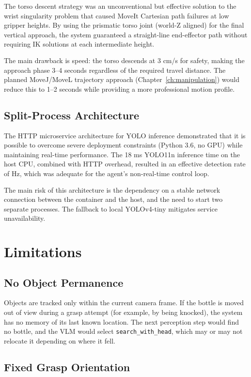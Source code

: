 The torso descent strategy was an unconventional but effective solution to the wrist
singularity problem that caused MoveIt Cartesian path failures at low gripper heights.
By using the prismatic torso joint (world-Z aligned) for the final vertical approach,
the system guaranteed a straight-line end-effector path without requiring IK solutions
at each intermediate height.

The main drawback is speed: the torso descends at 3 cm/s for safety, making the
approach phase 3--4 seconds regardless of the required travel distance.
The planned MoveJ/MoveL trajectory approach (Chapter~\ref{ch:manipulation}) would
reduce this to 1--2 seconds while providing a more professional motion profile.

\subsection{Split-Process Architecture}

The HTTP microservice architecture for YOLO inference demonstrated that it is possible
to overcome severe deployment constraints (Python 3.6, no GPU) while maintaining
real-time performance.
The 18 ms YOLO11n inference time on the host CPU, combined with HTTP overhead, resulted
in an effective detection rate of  Hz, which was adequate for the agent's
non-real-time control loop.

The main risk of this architecture is the dependency on a stable network connection
between the container and the host, and the need to start two separate processes.
The fallback to local YOLOv4-tiny mitigates service unavailability.

\section{Limitations}

\subsection{No Object Permanence}

Objects are tracked only within the current camera frame.
If the bottle is moved out of view during a grasp attempt (for example, by being
knocked), the system has no memory of its last known location.
The next perception step would find no bottle, and the VLM would select
\texttt{search\_with\_head}, which may or may not relocate it depending on where
it fell.

\subsection{Fixed Grasp Orientation}

